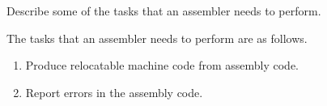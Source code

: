 \begin{exercise}\label{ex:010105}
    Describe some of the tasks that an assembler needs to perform.
\end{exercise}
\begin{solution}\label{sol:010105}
    The tasks that an assembler needs to perform are as follows.
    \begin{enumerate}
        \item Produce relocatable machine code from assembly code.
        \item Report errors in the assembly code.
    \end{enumerate}
\end{solution}